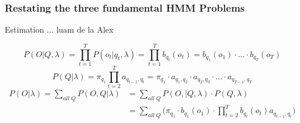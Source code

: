 \documentclass{beamer}
\begin{document}
\begin{frame}
  \frametitle{Restating the three fundamental HMM Problems}
  \begin{block}{Estimation}
    ... luam de la Alex
  \end{block}\pause
  \begin{equation}
    P(O \vert Q, \lambda) = \displaystyle\prod_{t=1}^{T} P(o_t \vert
    q_t, \lambda)= \displaystyle\prod_{t=1}^{T} b_{q_t}(o_t) =
    b_{q_1}(o_1) \cdot \ldots \cdot b_{q_T}(o_T)
    \label{eq:pql}
  \end{equation}\pause
  \begin{equation}
    P(Q | \lambda) = \pi_{q_1}\displaystyle\prod_{t=2}^{T}
    a_{q_{t-1},q_t} = \pi_{q_1} \cdot a_{q_1,q_2} \cdot a_{q_2,q_3} \cdot \ldots \cdot
    a_{q_{T-1},q_T}\label{eq:pql2}
  \end{equation}\pause
  \begin{equation}
    \begin{split}
      P(O \vert \lambda) = \displaystyle\sum_{all\;Q} P(O, Q \vert
      \lambda) & = \displaystyle\sum_{all\;Q} P(O,\vert Q, \lambda)
      \cdot P(Q, \lambda) \\
      & = \displaystyle\sum_{all\;Q} \Big( \pi_{q_1} \cdot b_{q_1}(o_1)
      \cdot \displaystyle\prod_{t=2}^{T} b_{q_t}(o_t) a_{q_{t-1},q_t} \Big)
    \end{split}
    \label{eq:pql3}
  \end{equation}
\end{frame}
\end{document}
